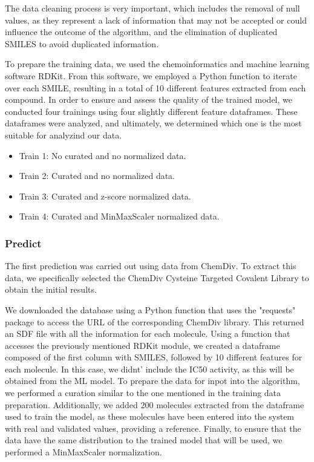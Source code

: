 \documentclass[final,times,twocolumn,article]{elsarticle}
\begin{document}
The data cleaning process is very important, which includes the removal of null values, as they represent a lack of information that may not be accepted or could influence the outcome of the algorithm, and the elimination of duplicated SMILES to avoid duplicated information. 

To prepare the training data, we used the chemoinformatics and machine learning software RDKit\cite{rdkit}. From this software, we employed a Python function to iterate over each SMILE, resulting in a total of 10 different features extracted from each compound. 
In order to ensure and assess the quality of the trained model, we conducted four trainings using four slightly different feature dataframes. These dataframes were analyzed, and ultimately, we determined which one is the most suitable for analyzind our data. 

\begin{itemize}
\item Train 1: No curated and no normalized data.
\item Train 2: Curated and no normalized data.
\item Train 3: Curated and z-score normalized data.
\item Train 4: Curated and MinMaxScaler normalized data.
\end{itemize}
\subsubsection{Predict}

The first prediction was carried out using data from ChemDiv. To extract this data, we specifically selected the ChemDiv Cysteine Targeted Covalent Library to obtain the initial results. 

We downloaded the database using a Python function that uses the "requests" package to access the URL of the corresponding ChemDiv library. This returned an SDF file with all the information for each molecule. Using a function that accesses the previously mentioned RDKit module, we created a dataframe composed of the first column with SMILES, followed by 10 different features for each molecule. In this case, we didnt' include the IC50 activity, as this will be obtained from the ML model. 
To prepare the data for inpot into the algorithm, we performed a curation similar to the one mentioned in the training data preparation. Additionally, we added 200 molecules extracted from the dataframe used to train the model, as these molecules have been entered into the system with real and validated values, providing a reference. Finally, to ensure that the data have the same distribution to the trained model that will be used, we performed a MinMaxScaler normalization. 
\end{document}
